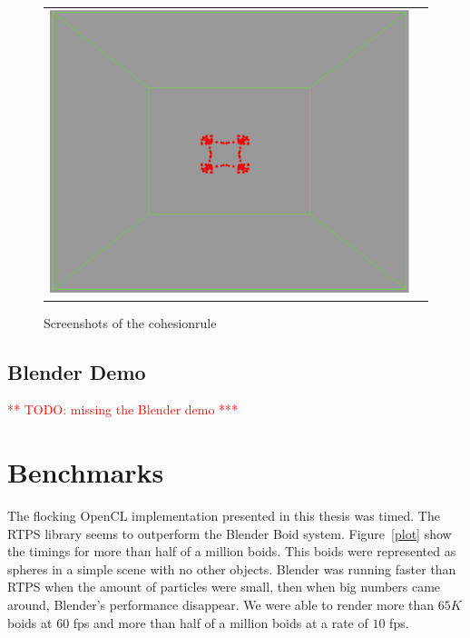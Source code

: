 \begin{figure}[htbp]
\begin{center}
\begin{tabular}{cc}
\includegraphics[scale= 0.15]{figures/coh4.pdf}
\end{tabular}
\end{center}
\caption{Screenshots of the cohesionrule}
\label{cohRule}
\end{figure}

\subsection{Blender Demo}
\textcolor{red}{** TODO: missing the Blender demo ***}

\section{Benchmarks}

The flocking OpenCL implementation presented in this thesis was timed. The RTPS library seems to outperform the Blender Boid system. Figure~\ref{plot} show the timings for more than half of a million boids. This boids were represented as spheres in a simple scene with no other objects. Blender was running faster than RTPS when the amount of particles were small, then when big numbers came around, Blender's performance disappear.  We were able to render more than $65K$ boids at $60$ fps and more than half of a million boids at a rate of $10$ fps.

